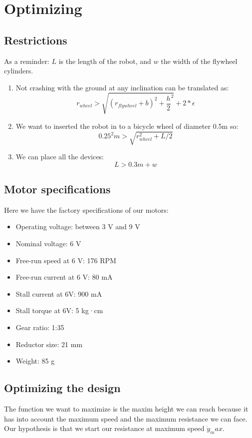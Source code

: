 \section{Optimizing}

\subsection{Restrictions}
As a reminder: $L$ is the length of the robot, and $w$ the width of the flywheel cylinders.
\begin{enumerate}
\item Not crashing with the ground at any inclination can be translated as:
\[r_{wheel}> \sqrt{(r_{flywheel} + b)^2+\frac{h}{2}^2} + 2*\epsilon\]
\item We want to inserted the robot in to a bicycle wheel of diameter 0.5m so:
\[0.25^2 m > \sqrt{r_{wheel}^2 + L/2}\]
\item We can place all the devices:
\[L > 0.3m + w \]
\end{enumerate}

\subsection{Motor specifications}

Here we have the factory specifications of our motors: 
\begin{itemize}
    \item Operating voltage: between 3 V and 9 V
    \item Nominal voltage: 6 V
    \item Free-run speed at 6 V: 176 RPM
    \item Free-run current at 6 V: 80 mA
    \item Stall current at 6V: 900 mA
    \item Stall torque at 6V: 5 kg·cm
    \item Gear ratio: 1:35
    \item Reductor size: 21 mm
    \item Weight: 85 g
\end{itemize}

\subsection{Optimizing the design}
The function we want to maximize is the maxim height we can reach because it has into account the maximum speed and the maximum resistance we can face.
Our hypothesis is that we start our resistance at maximum speed $\dot{y}_max$.

